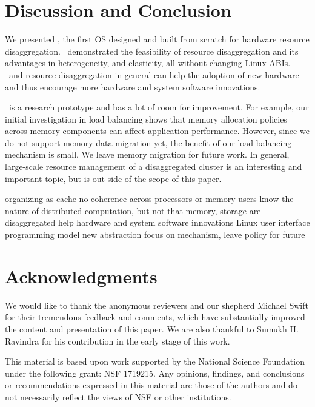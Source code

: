 \documentclass[10pt,times,twocolumn]{z2-article}
\begin{document}
{{{{{{{\section{Discussion and Conclusion}
\label{sec:conclude}

We presented \lego, the first OS designed and built from scratch for hardware resource disaggregation.
\lego\ demonstrated the feasibility of resource disaggregation and its advantages in 
heterogeneity, and elasticity, all without changing Linux ABIs.
\lego\ and resource disaggregation in general can help the adoption of new hardware
and thus encourage more hardware and system software innovations.  

\lego\ is a research prototype and has a lot of room for improvement.
For example, our initial investigation in load balancing 
shows that memory allocation policies across memory components can affect application performance.
However, since we do not support memory data migration yet, 
the benefit of our load-balancing mechanism is small.
We leave memory migration for future work.
In general, large-scale resource management of a disaggregated cluster is 
an interesting and important topic, but is out side of the scope of this paper.

organizing as cache
no coherence across processors or memory
users know the nature of distributed computation, but not that memory, storage are disaggregated
help hardware and system software innovations
Linux
user interface programming model
new abstraction
focus on mechanism, leave policy for future
\fi
\section*{Acknowledgments}

We would like to thank the anonymous reviewers and our shepherd Michael Swift
for their tremendous feedback and comments, which have
substantially improved the content and presentation of this paper.
We are also thankful to Sumukh H. Ravindra for his contribution in the early
stage of this work.

This material is based upon work supported by the National
Science Foundation under the following grant: NSF 1719215.
Any opinions, findings, and conclusions or recommendations
expressed in this material are those of the authors and do not 
necessarily reflect the views of NSF or other institutions.

%






}}}}}}}
\end{document}
